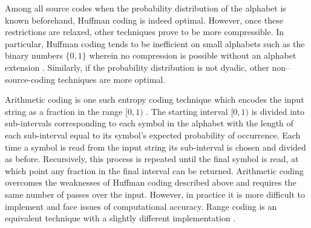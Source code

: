 Among all source codes when the probability distribution of the alphabet is known beforehand, Huffman coding is indeed optimal. However, once these restrictions are relaxed, other techniques prove to be more compressible. In particular, Huffman coding tends to be inefficient on small alphabets such as the binary numbers $\{0,1\}$ wherein no compression is possible without an alphabet extension \cite{arithmetic-coding}. Similarly, if the probability distribution is not dyadic, other non--source-coding techniques are more optimal.

Arithmetic coding is one such entropy coding technique which encodes the input string as a fraction in the range $[0,1)$ \cite{arithmetic-coding}. The starting interval $[0,1)$ is divided into sub-intervals corresponding to each symbol in the alphabet with the length of each sub-interval equal to its symbol's expected probability of occurrence. Each time a symbol is read from the input string its sub-interval is chosen and divided as before. Recursively, this process is repeated until the final symbol is read, at which point any fraction in the final interval can be returned. Arithmetic coding overcomes the weaknesses of Huffman coding described above and requires the same number of passes over the input. However, in practice it is more difficult to implement and face issues of computational accuracy. Range coding is an equivalent technique with a slightly different implementation \cite{range-coding}.

